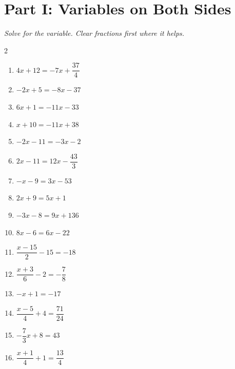 \documentclass[11pt]{article}
\begin{document}
\section*{Part I: Variables on Both Sides}
\noindent\textit{Solve for the variable. Clear fractions first where it helps.}
\begin{multicols}{2}
\begin{enumerate}
  \item $4x + 12 = -7x + \dfrac{37}{4}$
  \vspace{2.0cm}
  \item $-2x + 5 = -8x - 37$
  \vspace{2.0cm}
  \item $6x + 1 = -11x - 33$
  \vspace{2.0cm}
  \item $x + 10 = -11x + 38$
  \vspace{2.0cm}
  \item $-2x - 11 = -3x - 2$
  \vspace{2.0cm}
  \item $2x - 11 = 12x - \dfrac{43}{3}$
  \vspace{2.0cm}
  \item $-x - 9 = 3x - 53$
  \vspace{2.0cm}
  \item $2x + 9 = 5x + 1$
  \vspace{2.0cm}
  \item $-3x - 8 = 9x + 136$
  \vspace{2.0cm}
  \item $8x - 6 = 6x - 22$
  \vspace{2.0cm}
  \item $\dfrac{x - 15}{2} - 15 = -18$
  \vspace{2.0cm}
  \item $\dfrac{x + 3}{6} - 2 = -\dfrac{7}{8}$
  \vspace{2.0cm}
  \item $-x + 1 = -17$
  \vspace{2.0cm}
  \item $\dfrac{x - 5}{4} + 4 = \dfrac{71}{24}$
  \vspace{2.0cm}
  \item $-\dfrac{7}{3}x + 8 = 43$
  \vspace{2.0cm}
  \item $\dfrac{x + 1}{4} + 1 = \dfrac{13}{4}$
  \vspace{2.0cm}
\end{enumerate}
\end{multicols}
\end{document}
